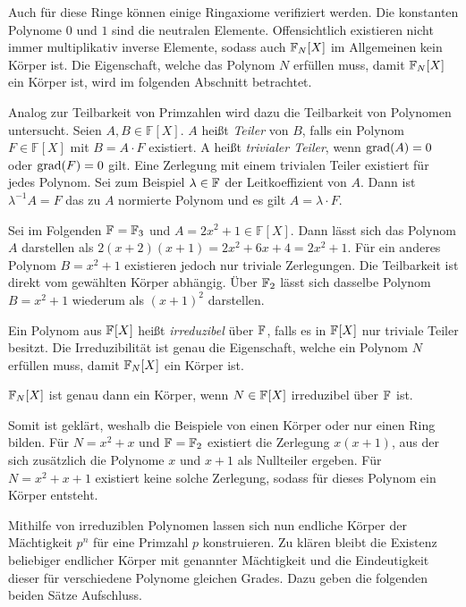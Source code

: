 Auch für diese Ringe können einige Ringaxiome verifiziert werden. Die konstanten Polynome $0$ und $1$ sind die neutralen Elemente. Offensichtlich existieren nicht immer multiplikativ inverse Elemente, sodass auch $\field{N} {[X]}$ im Allgemeinen kein Körper ist. Die Eigenschaft, welche das Polynom $N$ erfüllen muss, damit $\field{N} {[X]}$ ein Körper ist, wird im folgenden Abschnitt betrachtet.

Analog zur Teilbarkeit von Primzahlen wird dazu die Teilbarkeit von Polynomen untersucht. Seien $A,B \in \mathbb{F} {[X]}$. $A$ heißt \emph{Teiler} von $B$, falls ein Polynom $F \in \mathbb{F} {[X]}$ mit $B = A \cdot F$ existiert. A heißt \emph{trivialer Teiler}, wenn $\mathrm{grad}(A) = 0$ oder $\mathrm{grad}(F) = 0$ gilt. Eine Zerlegung mit einem trivialen Teiler existiert für jedes Polynom. Sei zum Beispiel $\lambda \in \field{}$  der Leitkoeffizient von $A$. Dann ist $\lambda^{-1}A = F$ das zu $A$ normierte Polynom und es gilt $A = \lambda\cdot F$.

Sei im Folgenden $\field{} = \field{3}$ und $A=2x^2 + 1 \in \mathbb{F} {[X]}$. Dann lässt sich das Polynom $A$ darstellen als $2(x+2)(x+1) = 2x^2 + 6x + 4 = 2x^2 + 1$. Für ein anderes Polynom $B=x^2 + 1$ existieren jedoch nur triviale Zerlegungen. Die Teilbarkeit ist direkt vom gewählten Körper abhängig. Über $\field{2}$ lässt sich dasselbe Polynom $B=x^2 + 1$ wiederum als $(x+1)^2$ darstellen.

Ein Polynom aus $\field{} {[X]}$ heißt \emph{irreduzibel} über $\field{}$, falls es in $\field{} {[X]}$ nur triviale Teiler besitzt. Die Irreduzibilität ist genau die Eigenschaft, welche ein Polynom $N$ erfüllen muss, damit $\field{N} {[X]}$ ein Körper ist. 

\begin{satz}
    $\field{N} {[X]}$ ist genau dann ein Körper, wenn $N \in \field{}{[X]}$ irreduzibel über $\field{}$ ist.
\end{satz}

Somit ist geklärt, weshalb die Beispiele von  einen Körper oder nur einen Ring bilden. Für $N=x^2 + x$ und $\field{} = \field{2}$ existiert die Zerlegung $x(x+1)$, aus der sich zusätzlich die Polynome $x$ und $x+1$ als Nullteiler ergeben. Für $N=x^2 + x + 1$ existiert keine solche Zerlegung, sodass für dieses Polynom ein Körper entsteht.

Mithilfe von irreduziblen Polynomen lassen sich nun endliche Körper der Mächtigkeit $p^n$ für eine Primzahl $p$ konstruieren. Zu klären bleibt die Existenz beliebiger endlicher Körper mit genannter Mächtigkeit und die Eindeutigkeit dieser für verschiedene Polynome gleichen Grades. Dazu geben die folgenden beiden Sätze Aufschluss.

